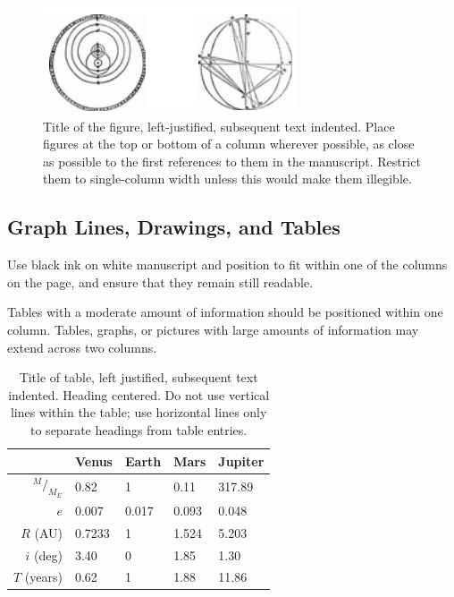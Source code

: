 \documentclass[]{iac}
\newcommand*\rfrac[2]{{{}^{#1}\!/_{#2}}} %
\begin{document}
\begin{figure}
\includegraphics[width=\columnwidth]{examplefigure.png}
\caption{\label{fig:X}Title of the figure, left-justified, subsequent text indented. Place figures at the top or bottom of a column wherever possible, as close as possible to the first references to them in the manuscript. Restrict them to single-column width unless this would make them illegible.}
\end{figure}

\subsection{Graph Lines, Drawings, and Tables}
Use black ink on white manuscript and position to fit within one of the columns on the page, and ensure that they remain still readable.

Tables with a moderate amount of information should be positioned within one column. Tables, graphs, or pictures with large amounts of information may extend across two columns.

\begin{table}
\begin{tabular}{rllll}
\toprule
& Venus & Earth & Mars & Jupiter \\
\midrule
$\rfrac{M}{M_E}$	& 0.82 		& 1 		& 0.11 		& 317.89	\\
$e$					& 0.007		& 0.017		& 0.093		& 0.048		\\
$R$ (AU)			& 0.7233	& 1			& 1.524		& 5.203		\\
$i$ (deg)			& 3.40		& 0			& 1.85		& 1.30		\\
$T$ (years)			& 0.62		& 1			& 1.88		& 11.86		\\
\bottomrule
\end{tabular}
\caption{\label{table:X}Title of table, left justified, subsequent text indented. Heading centered. Do not use vertical lines within the table; use horizontal lines only to separate headings from table entries.}
\end{table}
\end{document}
